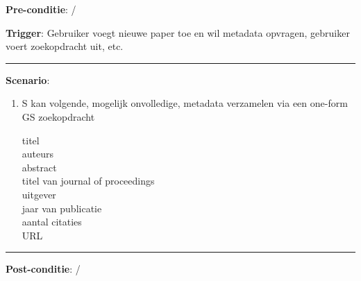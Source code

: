 \noindent \textbf{Pre-conditie}: /
\vspace{2 mm}

\noindent \textbf{Trigger}: Gebruiker voegt nieuwe paper toe en wil metadata opvragen, gebruiker voert zoekopdracht uit, etc.
\vspace{4 mm}

\hrule
\vspace{2 mm}
\noindent \textbf{Scenario}:
\begin{enumerate}
\item S kan volgende, mogelijk onvolledige, metadata verzamelen via een one-form GS zoekopdracht 
\begin{description}
  \item[titel]  \hfill
  \item[auteurs] \hfill 
   \item[abstract] \hfill
   \item[titel van journal of proceedings ] \hfill 
    \item[uitgever] \hfill 
   \item[jaar van publicatie] \hfill 
    \item[aantal citaties] \hfill
   \item[URL] \hfill 
  \end{description}
\end{enumerate}

\vspace{2 mm}
\hrule
\vspace{4 mm}


\noindent \textbf{Post-conditie}: / \\


\clearpage





